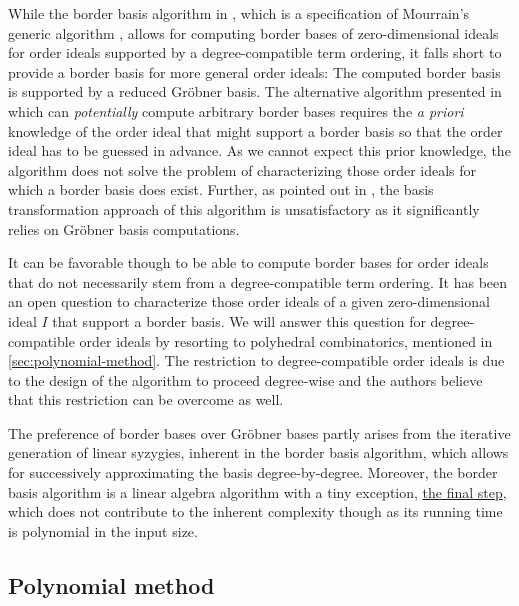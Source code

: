 \documentclass[11pt,oneside,english]{amsart}
\makeatletter
\numberwithin{equation}{section}
\numberwithin{figure}{section}
\theoremstyle{plain}
\theoremstyle{definition}
\theoremstyle{definition}
\theoremstyle{remark}
\theoremstyle{plain}
\theoremstyle{plain}
\theoremstyle{plain}
\theoremstyle{problem@}
\newcounter{problem}
\makeatother
\begin{document}
While the border basis algorithm in \cite{kehrein2006cbb}, which is a
specification of Mourrain's generic algorithm \cite{mourrain1999ncn}, allows
for computing border bases of zero-dimensional ideals for order ideals
supported by a degree-compatible term ordering, it falls short to
provide a border basis for more general order ideals: The computed
border basis is supported by a reduced Gröbner basis. The alternative
algorithm presented in \cite[Proposition 5]{kehrein2006cbb} which
can \emph{potentially} compute arbitrary border bases requires
the \emph{a priori} knowledge of the order ideal that might support
a border basis so that the order ideal has to be guessed in advance.
As we cannot expect this prior knowledge, the algorithm does not solve
the problem of characterizing those order ideals for which a border
basis does exist. Further, as pointed out in \cite[p.\ 284]{kehrein2006cbb},
the basis transformation approach of this algorithm is unsatisfactory
as it significantly relies on Gröbner basis computations.

It can be favorable though to be able to compute border bases for
order ideals that do not necessarily stem from a degree-compatible
term ordering.  It has been an open question to characterize those order
ideals of a given zero-dimensional ideal $I$ that support a border basis.
We will answer this question for degree-compatible order ideals by
resorting to polyhedral combinatorics, mentioned in
\autoref{sec:polynomial-method}.  The restriction
to degree-compatible order ideals is due to the design of the algorithm
to proceed degree-wise and the authors believe that this restriction
can be overcome as well.

The preference of border bases over Gröbner bases partly arises from
the iterative generation of linear syzygies, inherent in the border
basis algorithm, which allows for successively approximating the basis degree-by-degree. 
Moreover, the border basis algorithm is a linear algebra algorithm with a tiny exception,
\hyperref[alg:finalReduction]{the final step}, which does not contribute
to the inherent complexity though as
its running time is polynomial in the input size.

\subsection{Polynomial method}
\label{sec:polynomial-method}
\end{document}
